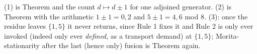 (1) is Theorem  and the count $d \mapsto d \pm 1$ for one adjoined generator. (2) is Theorem  with the arithmetic $1 \pm 1 = 0, 2$ and $5 \pm 1 = 4, 6$ mod $8$. (3): once the residue leaves $\{1, 5\}$ it never returns, since Rule 1 fixes it and Rule 2 is only ever invoked (indeed only ever \emph{defined}, as a transport demand) at $\{1,5\}$; Morita-stationarity after the last (hence only) fusion is Theorem  again.
